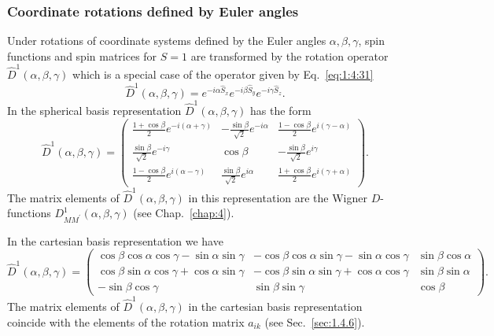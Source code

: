 \subsubsection{Coordinate rotations defined by Euler angles}

Under rotations of coordinate systems defined by the Euler angles $\alpha, \beta, \gamma$, spin functions and spin matrices for $S=1$ are transformed by the rotation operator $\hat{D}^{1}(\alpha, \beta, \gamma)$ which is a special case of the operator given by Eq.~\eqref{eq:1:4:31}
\begin{equation}
\widehat{D}^{1}(\alpha, \beta, \gamma)=e^{-i \alpha \widehat{S}_{x}} e^{-i \beta \widehat{S}_{y}} e^{-i \gamma \widehat{S}_{z}} \label{eq:2:6:75}.
\end{equation}
In the spherical basis representation $\hat{D}^{1}(\alpha, \beta, \gamma)$ has the form
\begin{equation}
\widehat{D}^{1}(\alpha, \beta, \gamma)=\begin{pmatrix}
\frac{1+\cos \beta}{2} e^{-i(\alpha+\gamma)} & -\frac{\sin \beta}{\sqrt{2}} e^{-i \alpha} & \frac{1-\cos \beta}{2} e^{i(\gamma-\alpha)}  \label{eq:2:6:76}\\
\frac{\sin \beta}{\sqrt{2}} e^{-i \gamma} & \cos \beta & -\frac{\sin \beta}{\sqrt{2}} e^{i \gamma} \\
\frac{1-\cos \beta}{2} e^{i(\alpha-\gamma)} & \frac{\sin \beta}{\sqrt{2}} e^{i \alpha} & \frac{1+\cos \beta}{2} e^{i(\gamma+\alpha)}
\end{pmatrix} .
\end{equation}
The matrix elements of $\widehat{D}^{1}(\alpha, \beta, \gamma)$ in this representation are the Wigner $D$-functions $D_{M M^{\prime}}^{1}(\alpha, \beta, \gamma)$ (see Chap.~\ref{chap:4}).

In the cartesian basis representation we have
\begin{equation}
\hat{D}^{1}(\alpha, \beta, \gamma)=\begin{pmatrix}
\cos \beta \cos \alpha \cos \gamma-\sin \alpha \sin \gamma & -\cos \beta \cos \alpha \sin \gamma-\sin \alpha \cos \gamma & \sin \beta \cos \alpha  \label{eq:2:6:77}\\
\cos \beta \sin \alpha \cos \gamma+\cos \alpha \sin \gamma & -\cos \beta \sin \alpha \sin \gamma+\cos \alpha \cos \gamma & \sin \beta \sin \alpha \\
-\sin \beta \cos \gamma & \sin \beta \sin \gamma & \cos \beta
\end{pmatrix} .
\end{equation}
The matrix elements of $\widehat{D}^{1}(\alpha, \beta, \gamma)$ in the cartesian basis representation coincide with the elements of the rotation matrix $a_{i k}$ (see Sec.~\ref{sec:1.4.6}).

